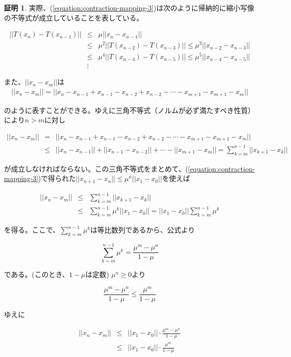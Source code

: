 \documentclass[dvipdfmx,autodetect-engine]{jsarticle}
\theoremstyle{definition}
\newtheorem*{Proof*}{証明}
\begin{document}
{\begin{Proof*}
実際、(\ref{equation:contraction-mapping-3})は次のように帰納的に縮小写像の不等式が成立していることを表している。

\begin{eqnarray*}
||T(x_n) - T(x_{n-1})|| &\leq& \mu ||x_n - x_{n-1}|| \\
&\leq& \mu^2 ||T(x_{n-2}) - T(x_{n-3})|| \leq \mu^3 ||x_{n-2} - x_{n-3}|| \\
&\leq& \mu^4 ||T(x_{n-4}) - T(x_{n-5})|| \leq \mu^5 ||x_{n-4} - x_{n-5}|| \\
&\vdots&
\end{eqnarray*}

また、$||x_n - x_m||$は
\begin{eqnarray*}
||x_n - x_m|| = ||x_n - x_{n-1} + x_{n-1} - x_{n-2} + x_{n-2} - \cdots - x_{m+1} - x_{m+1} - x_{m}||
\end{eqnarray*}

のように表すことができる。ゆえに三角不等式（ノルムが必ず満たすべき性質）により$n > m$に対し

\begin{eqnarray*}
||x_n - x_m|| &=& ||x_n - x_{n-1} + x_{n-1} - x_{n-2} + x_{n-2} - \cdots - x_{m+1} - x_{m+1} - x_{m}|| \\
&\leq& ||x_n - x_{n-1} || + || x_{n-1} - x_{n-2} ||  +  \cdots - || x_{m+1} - x_{m}|| = \sum_{k=m}^{n-1} ||x_{k+1} - x_k||
\end{eqnarray*}

が成立しなければならない。この三角不等式をまとめて、(\ref{equation:contraction-mapping-3})で得られた$||x_{n+1} - x_n|| \leq \mu^n ||x_1 - x_0||$を使えば

\begin{eqnarray*}
||x_n - x_m|| &\leq& \sum_{k=m}^{n-1} ||x_{k+1} - x_k|| \\
&\leq& \sum_{k=m}^{n-1} \mu^k ||x_1 - x_0|| = ||x_1 - x_0|| \sum_{k=m}^{n-1} \mu^k
\end{eqnarray*}

を得る。ここで、$\sum_{k=m}^{n-1} \mu^k$は等比数列であるから、公式より

$$
\sum_{k=m}^{n-1} \mu^k = \frac{\mu^m-\mu^n}{1 - \mu}
$$

である。(このとき、$1-\mu$は定数) $\mu^n \geq 0$より

$$
\frac{\mu^m-\mu^n}{1 - \mu} \leq \frac{\mu^m}{1 - \mu}
$$

ゆえに

\begin{eqnarray*}
||x_n - x_m|| &\leq& ||x_1 - x_0|| \cdot \frac{\mu^m-\mu^n}{1 - \mu} \\
&\leq& ||x_1 - x_0|| \cdot \frac{\mu^m}{1 - \mu}
\end{eqnarray*}


\end{Proof*}}
\end{document}
